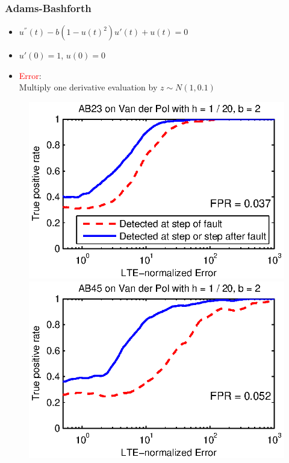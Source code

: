 \documentclass{beamer}
\begin{document}
\begin{frame}
\frametitle{Adams-Bashforth}

\begin{itemize}
\item $u^{''}(t) - b(1 - u(t)^2)u'(t) + u(t) = 0$
\item $u'(0) = 1$, $u(0) = 0$
\item \textcolor{red}{Error}: \\
Multiply one derivative evaluation by $z \sim N(1, 0.1)$
\end{itemize}

\begin{figure}
  \includegraphics[scale=0.6]{figs/ab23_vdp_2_func.eps}
  \includegraphics[scale=0.6]{figs/ab45_vdp_2_func.eps}
\end{figure}

\end{frame}
\end{document}
